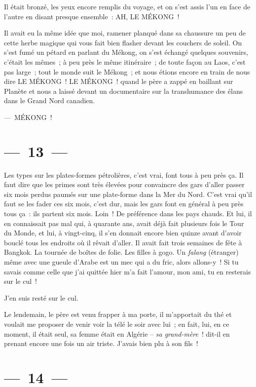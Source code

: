 \documentclass[twoside]{book} %
\begin{document}
Il était bronzé, les yeux encore remplis du voyage, et on s’est assis l’un en face de l’autre en disant presque ensemble : AH, LE MÉKONG !\par
Il avait eu la même idée que moi, ramener planqué dans sa chaussure un peu de cette herbe magique qui vous fait bien flasher devant les couchers de soleil. On s’est fumé un pétard en parlant du Mékong, on s’est échangé quelques souvenirs, c’était les mêmes ; à peu près le même itinéraire ; de toute façon au Laos, c’est pas large ; tout le monde suit le Mékong ; et nous étions encore en train de nous dire LE MÉKONG ! LE MÉKONG ! quand le père a zappé en baillant sur Planète et nous a laissé devant un documentaire sur la transhumance des élans dans le Grand Nord canadien.\par
— MÉKONG !

\section[{— 13 —}]{— 13 —}
\renewcommand{\leftmark}{— 13 —}

\noindent Les types sur les plates-formes pétrolières, c’est vrai, font tous à peu près ça. Il faut dire que les primes sont très élevées pour convaincre des gars d’aller passer six mois perdus paumés sur une plate-forme dans la Mer du Nord. C’est vrai qu’il faut se les fader ces six mois, c’est dur, mais les gars font en général à peu près tous ça : ils partent six mois. Loin ! De préférence dans les pays chauds. Et lui, il en connaissait pas mal qui, à quarante ans, avait déjà fait plusieurs fois le Tour du Monde, et lui, à vingt-cinq, il s’en donnait encore bien quinze avant d’avoir bouclé tous les endroits où il rêvait d’aller. Il avait fait trois semaines de fête à Bangkok. La tournée de boîtes de folie. Les filles à gogo. Un \emph{falang} (étranger) même avec une gueule d’Arabe est un mec qui a du fric, alors allons-y ! Si tu savais comme celle que j’ai quittée hier m’a fait l’amour, mon ami, tu en resterais sur le cul !\par
J’en suis resté sur le cul.\par
Le lendemain, le père est venu frapper à ma porte, il m’apportait du thé et voulait me proposer de venir voir la télé le soir avec lui ; en fait, lui, en ce moment, il était seul, sa femme était en Algérie – \emph{sa grand-mère} ! dit-il en prenant encore une fois un air triste. J’avais bien plu à son fils !

\section[{— 14 —}]{— 14 —}
\renewcommand{\leftmark}{— 14 —}
\end{document}
